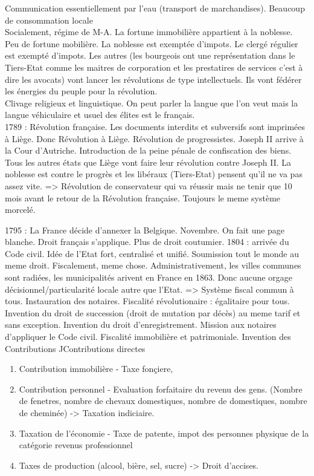 \documentclass{book}
\begin{document}
Communication essentiellement par l'eau (transport de marchandises). Beaucoup de consommation locale\\

Socialement, régime de M-A. La fortune immobilière appartient à la noblesse. Peu de fortune mobilière. La noblesse est exemptée d'impots. Le clergé régulier est exempté d'impots. Les autres (les bourgeois ont une représentation dans le Tiers-Etat comme les maitres de corporation et les prestatires de services c'est à dire les avocats) vont lancer les révolutions de type intellectuels. Ils vont fédérer les énergies du peuple pour la révolution.\\

Clivage religieux et linguistique. On peut parler la langue que l'on veut mais la langue véhiculaire et usuel des élites est le français.\\

1789 : Révolution française. Les documents interdits et subversifs sont imprimées à Liège. Donc Révolution à Liège. Révolution de progressistes. Joseph II arrive à la Cour d'Autriche. Introduction de la peine pénale de confiscation des biens. Tous les autres états que Liège vont faire leur révolution contre Joseph II. La noblesse est contre le progrès et les libéraux (Tiers-Etat) pensent qu'il ne va pas assez vite. => Révolution de conservateur qui va réussir mais ne tenir que 10 mois avant le retour de la Révolution française. Toujours le meme système morcelé.

1795 : La France décide d'annexer la Belgique. Novembre. On fait une page blanche. Droit français s'applique. Plus de droit coutumier. 1804 : arrivée du Code civil. Idée de l'Etat fort, centralisé et unifié. Soumission tout le monde au meme droit. Fiscalement, meme chose. Administrativement, les villes communes sont radiées, les municipalités arivent en France en 1863. Donc aucune orgage décisionnel/particularité locale autre que l'Etat. => Système fiscal commun à tous. Instauration des notaires. Fiscalité révolutionaire : égalitaire pour tous. Invention du droit de succession (droit de mutation par décès) au meme tarif et sans exception. Invention du droit d'enregistrement. Mission aux notaires d'appliquer le Code civil. Fiscalité immobilière et patrimoniale. Invention des Contributions ^^
Contributions directes 

\begin{enumerate}
\item Contribution immobilière - Taxe fonçiere, 
\item Contribution personnel - Evaluation forfaitaire du revenu des gens. (Nombre de fenetres, nombre de chevaux domestiques, nombre de domestiques, nombre de cheminée) -> Taxation indiciaire.
\item Taxation de l'économie - Taxe de patente, impot des personnes physique de la catégorie revenus professionnel
\item Taxes de production (alcool, bière, sel, sucre) -> Droit d'accises.
\end{enumerate}
\end{document}
